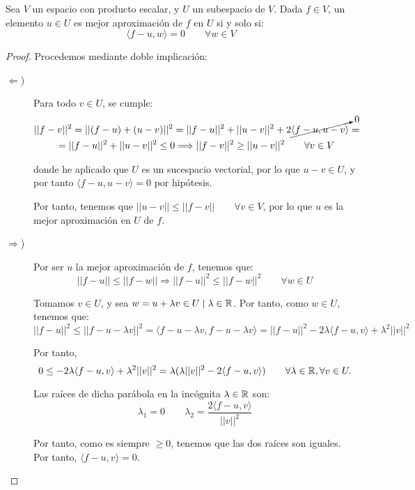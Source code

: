 \begin{teo}
    Sea $V$ un espacio con producto escalar, y $U$ un subespacio de $V$. Dada $f\in V$, un elemento $u\in U$ es mejor aproximación de $f$ en $U$ si y solo si:
\begin{equation*}
    \langle f-u,w\rangle = 0\qquad \forall w\in V
\end{equation*}
\end{teo}
\begin{proof}
    Procedemos mediante doble implicación:
    \begin{description}
        \item [$\Longleftarrow$)] Para todo $v\in U$, se cumple:
        \begin{multline*}
            ||f-v||^2 = ||(f-u)+(u-v)||^2 = ||f-u||^2 + ||u-v||^2 +2\cancelto{0}{\langle f-u,u-v\rangle} = \\=
            ||f-u||^2 +||u-v||^2 \leq 0 \Longrightarrow ||f-v||^2 \geq ||u-v||^2 \qquad \forall v\in V
        \end{multline*}

        donde he aplicado que $U$ es un sucespacio vectorial, por lo que $u-v\in U$, y por tanto $\langle f-u,u-v\rangle = 0$ por hipótesis.

        Por tanto, tenemos que $||u-v||\leq ||f-v|| \qquad \forall v\in V$, por lo que $u$ es la mejor aproximación en $U$ de $f$.

        \item [$\Longrightarrow$)] Por ser $u$ la mejor aproximación de $f$, tenemos que:
        \begin{equation*}
            ||f-u||\leq ||f-w|| \Longrightarrow ||f-u||^2\leq ||f-w||^2 \qquad \forall w\in U
        \end{equation*}

        Tomamos $v\in U$, y sea $w=u+\lambda v \in U \mid \lambda \in \mathbb{R}$. Por tanto, como $w\in U$, tenemos que:
        \begin{equation*}
            ||f-u||^2\leq ||f-u-\lambda v||^2 = \langle f-u-\lambda v, f-u-\lambda v\rangle = ||f-u||^2 -2\lambda \langle f-u,v\rangle +\lambda^2 ||v||^2
        \end{equation*}

        Por tanto,
        \begin{equation*}
            0 \leq -2\lambda \langle f-u,v\rangle +\lambda^2 ||v||^2 
            = \lambda (\lambda ||v||^2 -2 \langle f-u,v\rangle) 
            \qquad \forall \lambda\in \mathbb{R}, \forall v\in U.
        \end{equation*}

        Las raíces de dicha parábola en la incógnita $\lambda \in \mathbb{R}$ son:
        \begin{equation*}
            \lambda_1 = 0 \qquad \lambda_2 = \frac{2\langle f-u,v\rangle}{||v||^2}
        \end{equation*}

        Por tanto, como es siempre $\geq 0$, tenemos que las dos raíces son iguales. Por tanto, $\langle f-u,v\rangle = 0$.
    \end{description}
\end{proof}


